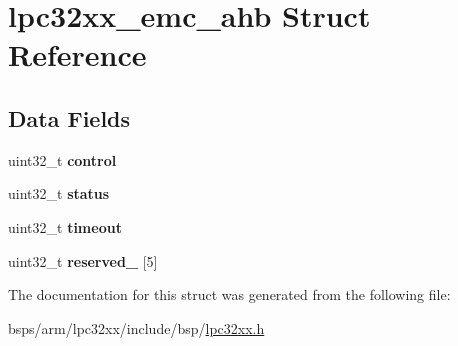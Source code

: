\hypertarget{structlpc32xx__emc__ahb}{}\section{lpc32xx\+\_\+emc\+\_\+ahb Struct Reference}
\label{structlpc32xx__emc__ahb}
\subsection*{Data Fields}
\begin{DoxyCompactItemize}
\item 
\mbox{\label{structlpc32xx__emc__ahb_a48e91bcba25948690d7c439dbf7fe504}} 
uint32\+\_\+t {\bfseries control}
\item 
\mbox{\label{structlpc32xx__emc__ahb_ad363067bdea1a1bc57a19442bfcfbacd}} 
uint32\+\_\+t {\bfseries status}
\item 
\mbox{\label{structlpc32xx__emc__ahb_a08c30702231648a8e6e4660b01105219}} 
uint32\+\_\+t {\bfseries timeout}
\item 
\mbox{\label{structlpc32xx__emc__ahb_abce93541dd9b66f2c1c5b32a887f694e}} 
uint32\+\_\+t {\bfseries reserved\+\_} \mbox{[}5\mbox{]}
\end{DoxyCompactItemize}


The documentation for this struct was generated from the following file\+:\begin{DoxyCompactItemize}
\item 
bsps/arm/lpc32xx/include/bsp/\mbox{\hyperlink{lpc32xx_8h}{lpc32xx.\+h}}\end{DoxyCompactItemize}
